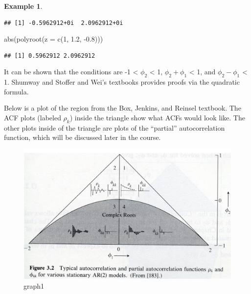 \documentclass[
]{book}
\newenvironment{Shaded}{\begin{snugshade}}{\end{snugshade}}
\newcommand{\AttributeTok}[1]{\textcolor[rgb]{0.77,0.63,0.00}{#1}}
\newcommand{\DecValTok}[1]{\textcolor[rgb]{0.00,0.00,0.81}{#1}}
\newcommand{\FloatTok}[1]{\textcolor[rgb]{0.00,0.00,0.81}{#1}}
\newcommand{\FunctionTok}[1]{\textcolor[rgb]{0.00,0.00,0.00}{#1}}
\newcommand{\NormalTok}[1]{#1}
\newcommand{\SpecialCharTok}[1]{\textcolor[rgb]{0.00,0.00,0.00}{#1}}
\theoremstyle{definition}
\theoremstyle{definition}
\newtheorem{example}{Example}[chapter]
\theoremstyle{definition}
\theoremstyle{definition}
\theoremstyle{remark}
\begin{document}
\begin{example}
\begin{verbatim}
## [1] -0.5962912+0i  2.0962912+0i
\end{verbatim}

\begin{Shaded}
\begin{Highlighting}[]
\FunctionTok{abs}\NormalTok{(}\FunctionTok{polyroot}\NormalTok{(}\AttributeTok{z =} \FunctionTok{c}\NormalTok{(}\DecValTok{1}\NormalTok{, }\FloatTok{1.2}\NormalTok{, }\SpecialCharTok{{-}}\FloatTok{0.8}\NormalTok{))) }
\end{Highlighting}
\end{Shaded}

\begin{verbatim}
## [1] 0.5962912 2.0962912
\end{verbatim}

\end{example}

It can be shown that the conditions are -1 \textless{} \(\phi_2\) \textless{} 1, \(\phi_2+\phi_1\) \textless{} 1, and \(\phi_2-\phi_1\) \textless{} 1. Shumway and Stoffer and Wei's textbooks provides proofs via the quadratic formula.

Below is a plot of the region from the Box, Jenkins, and Reinsel textbook. The ACF plots (labeled \(\rho_k\)) inside the triangle show what ACFs would look like. The other plots inside of the triangle are plots of the ``partial'' autocorrelation function, which will be discussed later in the course.

\begin{figure}
\centering
\includegraphics{ARMA-graph1.png}
\caption{graph1}
\end{figure}
\end{document}
